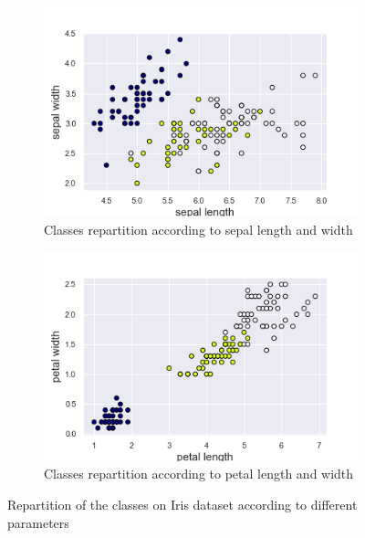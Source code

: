 \documentclass[twocolumn, 10pt]{article}
\begin{document}
			\begin{figure}[h]
				\centering
				\begin{subfigure}[t]{.49\columnwidth}
					\centering
					\includegraphics[width=\linewidth]{../graphics/org_sepal_length_sepal_width_label.png}
					\caption{Classes repartition according to sepal length and width}
					\label{fig:iris_org_sep}
				\end{subfigure}
				\begin{subfigure}[t]{.49\columnwidth}
					\centering
					\includegraphics[width=\linewidth]{../graphics/org_petal_length_petal_width_label.png}
					\caption{Classes repartition according to petal length and width}
					\label{fig:iris_org_pet}
				\end{subfigure}
				\caption{Repartition of the classes on Iris dataset according to different parameters}
				\label{fig:iris_org}
			\end{figure}
\end{document}
